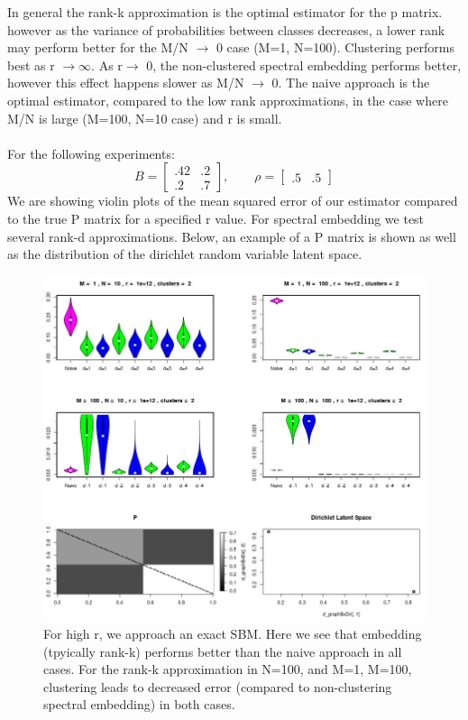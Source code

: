 \documentclass[11pt]{article}
\begin{document}
In general the rank-k approximation is the optimal estimator for the p matrix. however as the variance of probabilities between classes decreases, a lower rank may perform better for the M/N $\rightarrow$ 0 case (M=1, N=100).  Clustering performs best as r $\rightarrow \infty$.  As r$\rightarrow$ 0, the non-clustered spectral embedding performs better, however this effect happens slower as M/N $\rightarrow$ 0.  The naive approach is the optimal estimator, compared to the low rank approximations, in the case where M/N is large (M=100, N=10 case) and r is small.
\\\\
For the following experiments:
\begin{equation*}
B = \begin{bmatrix}
.42 & .2 \\
.2 & .7 
\end{bmatrix}
,\qquad \rho = \begin{bmatrix}
.5 & .5
\end{bmatrix}
\end{equation*}
We are showing violin plots of the mean squared error of our estimator compared to the true P matrix for a specified r value.  For spectral embedding we test several rank-d approximations.  Below, an example of a P matrix is shown as well as the distribution of the dirichlet random variable latent space. 
\newpage
\begin{figure}[!htb]
	\centering
	\includegraphics[width=18cm]{Capture1.jpg}
	\caption{For high r, we approach an exact SBM. Here we see that embedding (tpyically rank-k) performs better than the naive approach in all cases. For the rank-k approximation in N=100, and M=1, M=100, clustering leads to decreased error (compared to non-clustering spectral embedding) in both cases.}
	\label{fig:plot1}
\end{figure}
\end{document}
